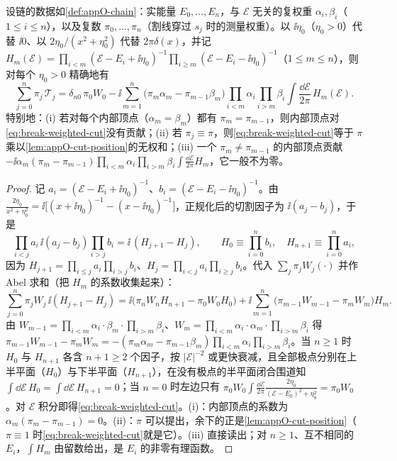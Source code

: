\begin{lemma}[带测量权重的割位置恒等式]\label{lem:break-weighted-cut}
设链的数据如\cref{def:appO-chain}：实能量 $E_0,\dots,E_n$，与 $\mathcal E$ 无关的复权重 $\alpha_i,\beta_i$（$1\le i\le n$），以及复数 $\pi_0,\dots,\pi_n$（割线穿过 $s_j$ 时的测量权重）。以 $\ii\eta_0$（$\eta_0>0$）代替 $\ii0$、以 $2\eta_0/(x^2+\eta_0^2)$ 代替 $2\pi\delta(x)$，并记
$H_m(\mathcal E)=\prod_{i<m}(\mathcal E-E_i+\ii\eta_0)^{-1}\prod_{i\ge m}(\mathcal E-E_i-\ii\eta_0)^{-1}$（$1\le m\le n$），则对每个 $\eta_0>0$ 精确地有
\begin{equation}\label{eq:break-weighted-cut}
\sum_{j=0}^n\pi_j\,\mathcal T_j=\delta_{n0}\,\pi_0W_0-\ii\sum_{m=1}^n\big(\pi_m\alpha_m-\pi_{m-1}\beta_m\big)\prod_{i<m}\alpha_i\prod_{i>m}\beta_i\int\frac{\dd\mathcal E}{2\pi}\,H_m(\mathcal E).
\end{equation}
特别地：(i) 若对每个内部顶点（$\alpha_m=\beta_m$）都有 $\pi_m=\pi_{m-1}$，则内部顶点对\cref{eq:break-weighted-cut}没有贡献；(ii) 若 $\pi_j\equiv\pi$，则\cref{eq:break-weighted-cut}等于 $\pi$ 乘以\cref{lem:appO-cut-position}的无权和；(iii) 一个 $\pi_m\neq\pi_{m-1}$ 的内部顶点贡献 $-\ii\alpha_m(\pi_m-\pi_{m-1})\prod_{i<m}\alpha_i\prod_{i>m}\beta_i\int\frac{\dd\mathcal E}{2\pi}H_m$，它一般不为零。
\end{lemma}

\begin{proof}
记 $a_i=(\mathcal E-E_i+\ii\eta_0)^{-1}$、$b_i=(\mathcal E-E_i-\ii\eta_0)^{-1}$。由 $\frac{2\eta_0}{x^2+\eta_0^2}=\ii\big[(x+\ii\eta_0)^{-1}-(x-\ii\eta_0)^{-1}\big]$，正规化后的切割因子为 $\ii(a_j-b_j)$，于是
\[
\prod_{i<j}a_i\,\ii(a_j-b_j)\prod_{i>j}b_i=\ii\,(H_{j+1}-H_j),\qquad H_0\equiv\prod_{i=0}^nb_i,\quad H_{n+1}\equiv\prod_{i=0}^na_i ,
\]
因为 $H_{j+1}=\prod_{i\le j}a_i\prod_{i>j}b_i$、$H_j=\prod_{i<j}a_i\prod_{i\ge j}b_i$。代入 $\sum_j\pi_jW_j(\cdot)$ 并作 Abel 求和（把 $H_m$ 的系数收集起来）：
\[
\sum_{j=0}^n\pi_jW_j\,\ii(H_{j+1}-H_j)=\ii\big(\pi_nW_nH_{n+1}-\pi_0W_0H_0\big)+\ii\sum_{m=1}^{n}\big(\pi_{m-1}W_{m-1}-\pi_mW_m\big)H_m .
\]
由 $W_{m-1}=\prod_{i<m}\alpha_i\cdot\beta_m\cdot\prod_{i>m}\beta_i$、$W_m=\prod_{i<m}\alpha_i\cdot\alpha_m\cdot\prod_{i>m}\beta_i$ 得 $\pi_{m-1}W_{m-1}-\pi_mW_m=-(\pi_m\alpha_m-\pi_{m-1}\beta_m)\prod_{i<m}\alpha_i\prod_{i>m}\beta_i$。当 $n\ge1$ 时 $H_0$ 与 $H_{n+1}$ 各含 $n+1\ge2$ 个因子，按 $|\mathcal E|^{-2}$ 或更快衰减，且全部极点分别在上半平面（$H_0$）与下半平面（$H_{n+1}$），在没有极点的半平面闭合围道知 $\int\dd\mathcal E\,H_0=\int\dd\mathcal E\,H_{n+1}=0$；当 $n=0$ 时左边只有 $\pi_0W_0\int\frac{\dd\mathcal E}{2\pi}\frac{2\eta_0}{(\mathcal E-E_0)^2+\eta_0^2}=\pi_0W_0$。对 $\mathcal E$ 积分即得\cref{eq:break-weighted-cut}。(i)：内部顶点的系数为 $\alpha_m(\pi_m-\pi_{m-1})=0$。(ii)：$\pi$ 可以提出，余下的正是\cref{lem:appO-cut-position}（$\pi\equiv1$ 时\cref{eq:break-weighted-cut}就是它）。(iii) 直接读出；对 $n\ge1$、互不相同的 $E_i$，$\int H_m$ 由留数给出，是 $E_i$ 的非零有理函数。
\end{proof}

